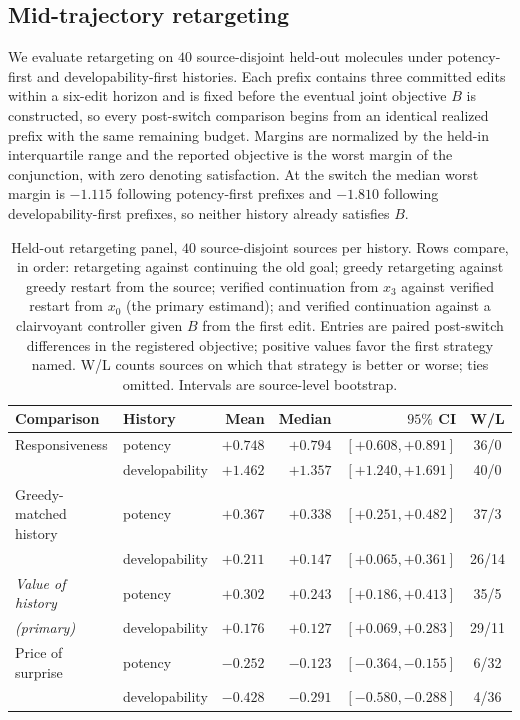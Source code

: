 \subsection{Mid-trajectory retargeting}
\label{app:exp-retarget}

We evaluate retargeting on $40$ source-disjoint held-out molecules under potency-first and developability-first histories. Each prefix contains three committed edits within a six-edit horizon and is fixed before the eventual joint objective $B$ is constructed, so every post-switch comparison begins from an identical realized prefix with the same remaining budget. Margins are normalized by the held-in interquartile range and the reported objective is the worst margin of the conjunction, with zero denoting satisfaction. At the switch the median worst margin is $-1.115$ following potency-first prefixes and $-1.810$ following developability-first prefixes, so neither history already satisfies $B$.

\begin{table}[h]
\centering
{\small\setlength{\tabcolsep}{4pt}
\begin{tabular}{llrrrc}
\toprule
Comparison & History & Mean & Median & $95\%$ CI & W/L \\
\midrule
Responsiveness & potency & $+0.748$ & $+0.794$ & $[+0.608,+0.891]$ & 36/0 \\
 & developability & $+1.462$ & $+1.357$ & $[+1.240,+1.691]$ & 40/0 \\[2pt]
Greedy-matched history & potency & $+0.367$ & $+0.338$ & $[+0.251,+0.482]$ & 37/3 \\
 & developability & $+0.211$ & $+0.147$ & $[+0.065,+0.361]$ & 26/14 \\[2pt]
\emph{Value of history} & potency & $+0.302$ & $+0.243$ & $[+0.186,+0.413]$ & 35/5 \\
\emph{(primary)} & developability & $+0.176$ & $+0.127$ & $[+0.069,+0.283]$ & 29/11 \\[2pt]
Price of surprise & potency & $-0.252$ & $-0.123$ & $[-0.364,-0.155]$ & 6/32 \\
 & developability & $-0.428$ & $-0.291$ & $[-0.580,-0.288]$ & 4/36 \\
\bottomrule
\end{tabular}}
\caption{\small Held-out retargeting panel, $40$ source-disjoint sources per history. Rows compare, in order: retargeting against continuing the old goal; greedy retargeting against greedy restart from the source; verified continuation from $x_3$ against verified restart from $x_0$ (the primary estimand); and verified continuation against a clairvoyant controller given $B$ from the first edit. Entries are paired post-switch differences in the registered objective; positive values favor the first strategy named. W/L counts sources on which that strategy is better or worse; ties omitted. Intervals are source-level bootstrap.}
\label{tab:retarget-full}
\end{table}

